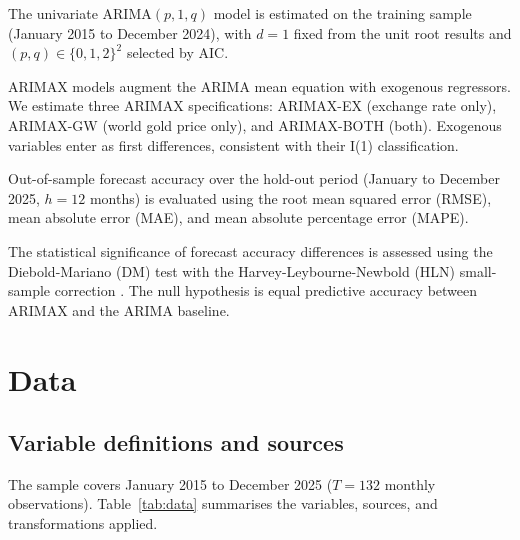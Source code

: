 \documentclass[12pt,a4paper]{article}
\begin{document}
The univariate ARIMA$(p, 1, q)$ model is estimated on the training sample
(January 2015 to December 2024), with $d=1$ fixed from the unit root
results and $(p, q) \in \{0,1,2\}^2$ selected by AIC.

ARIMAX models augment the ARIMA mean equation with exogenous regressors.
We estimate three ARIMAX specifications: ARIMAX-EX (exchange rate only),
ARIMAX-GW (world gold price only), and ARIMAX-BOTH (both). Exogenous
variables enter as first differences, consistent with their I(1)
classification.

Out-of-sample forecast accuracy over the hold-out period (January to
December 2025, $h = 12$ months) is evaluated using the root mean squared
error (RMSE), mean absolute error (MAE), and mean absolute percentage
error (MAPE).

The statistical significance of forecast accuracy differences is assessed
using the Diebold-Mariano (DM) test \citep{diebold1995} with the
Harvey-Leybourne-Newbold (HLN) small-sample correction \citep{harvey1997}.
The null hypothesis is equal predictive accuracy between ARIMAX and the
ARIMA baseline.

\section{Data}
\label{sec:data}

\subsection{Variable definitions and sources}

The sample covers January 2015 to December 2025 ($T = 132$ monthly
observations). Table~\ref{tab:data} summarises the variables, sources,
and transformations applied.
\end{document}
